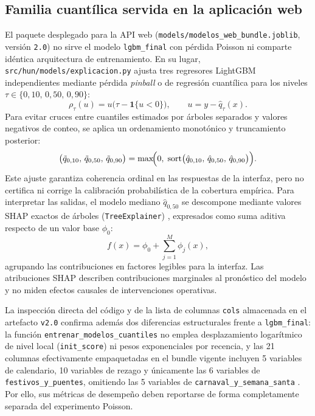 \subsection{Familia cuantílica servida en la aplicación web}

El paquete desplegado para la API web (\texttt{models/modelos\_web\_bundle.joblib}, versión \texttt{2.0}) no sirve el modelo \texttt{lgbm\_final} con pérdida Poisson ni comparte idéntica arquitectura de entrenamiento. En su lugar, \texttt{src/hun/models/explicacion.py} ajusta tres regresores LightGBM independientes mediante pérdida \textit{pinball} o de regresión cuantílica \parencite{koenker1978quantiles,ke2017lightgbm} para los niveles $\tau \in \{0{,}10,\, 0{,}50,\, 0{,}90\}$:
\begin{equation}
\label{eq:pinball}
\rho_\tau(u) = u\bigl(\tau - \mathbf{1}\{u < 0\}\bigr), \qquad u = y - \hat{q}_\tau(x).
\end{equation}
Para evitar cruces entre cuantiles estimados por árboles separados y valores negativos de conteo, se aplica un ordenamiento monotónico y truncamiento posterior:
\begin{equation}
\label{eq:orden_cuantiles}
\bigl(\tilde{q}_{0{,}10},\, \tilde{q}_{0{,}50},\, \tilde{q}_{0{,}90}\bigr) = \max\!\Bigl(0,\; \operatorname{sort}\bigl(\hat{q}_{0{,}10},\, \hat{q}_{0{,}50},\, \hat{q}_{0{,}90}\bigr)\Bigr).
\end{equation}
Este ajuste garantiza coherencia ordinal en las respuestas de la interfaz, pero no certifica ni corrige la calibración probabilística de la cobertura empírica. Para interpretar las salidas, el modelo mediano $\hat{q}_{0{,}50}$ se descompone mediante valores SHAP exactos de árboles (\texttt{TreeExplainer}) \parencite{lundberg2017shap}, expresados como suma aditiva respecto de un valor base $\phi_0$:
\begin{equation}
\label{eq:shap}
f(x) = \phi_0 + \sum_{j=1}^{M} \phi_j(x),
\end{equation}
agrupando las contribuciones en factores legibles para la interfaz. Las atribuciones SHAP describen contribuciones marginales al pronóstico del modelo y no miden efectos causales de intervenciones operativas.

La inspección directa del código y de la lista de columnas \texttt{cols} almacenada en el artefacto \texttt{v2.0} confirma además dos diferencias estructurales frente a \texttt{lgbm\_final}: la función \texttt{entrenar\_modelos\_cuantiles} no emplea desplazamiento logarítmico de nivel local (\texttt{init\_score}) ni pesos exponenciales por recencia, y las 21 columnas efectivamente empaquetadas en el bundle vigente incluyen 5 variables de calendario, 10 variables de rezago y únicamente las 6 variables de \texttt{festivos\_y\_puentes}, omitiendo las 5 variables de \texttt{carnaval\_y\_semana\_santa} \parencite{mediflow2026bundle}. Por ello, sus métricas de desempeño deben reportarse de forma completamente separada del experimento Poisson.

